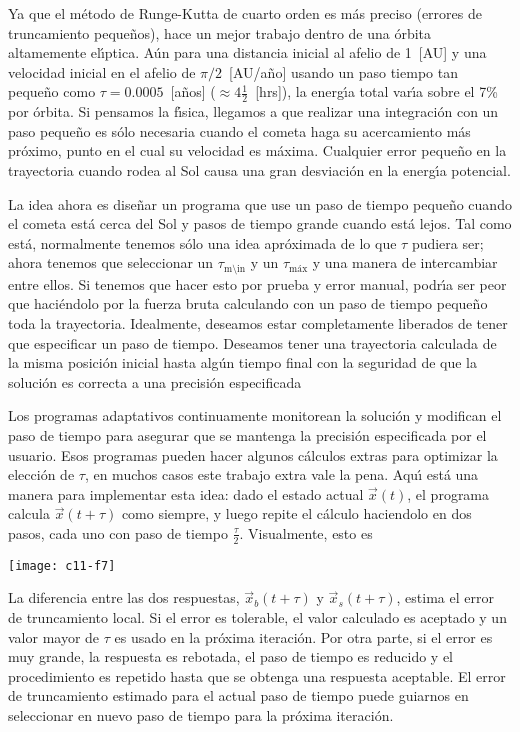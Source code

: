 Ya que el m{\'e}todo de Runge-Kutta de cuarto orden es m{\'a}s preciso
(errores de truncamiento peque{\~n}os), hace un mejor trabajo dentro de
una {\'o}rbita altamemente el{\'\i}ptica. A{\'u}n para una distancia inicial al
afelio de 1~[AU] y una velocidad inicial en el afelio de
$\pi/2$~[AU/a{\~n}o] usando un paso tiempo tan peque{\~n}o como
$\tau=0.0005$~[a{\~n}os] ($\approx4 \frac 12$~[hrs]), la energ{\'\i}a total var{\'\i}a sobre
el 7\% por {\'o}rbita. Si pensamos la f{\'\i}sica, llegamos a que realizar una
integraci{\'o}n con un paso peque{\~n}o es s{\'o}lo necesaria cuando el cometa
haga su acercamiento m{\'a}s pr{\'o}ximo, punto en el cual su velocidad es
m{\'a}xima. Cualquier error peque{\~n}o en la trayectoria cuando rodea al Sol
causa una gran desviaci{\'o}n en la energ{\'\i}a potencial.

La idea ahora es dise{\~n}ar un programa que use un paso de tiempo peque{\~n}o
cuando el cometa est{\'a} cerca del Sol y pasos de tiempo grande cuando
est{\'a} lejos. Tal como est{\'a}, normalmente tenemos s{\'o}lo una idea
apr{\'o}ximada de lo que $\tau$ pudiera ser; ahora tenemos que seleccionar un
$\tau_{\text{m{\'\i}n}}$ y un $\tau_{\text{m{\'a}x}}$ y una manera de intercambiar
entre ellos.  Si tenemos que hacer esto por prueba y error manual,
podr{\'\i}a ser peor que haci{\'e}ndolo por la fuerza bruta calculando con un
paso de tiempo peque{\~n}o toda la trayectoria.  Idealmente, deseamos
estar completamente liberados de tener que especificar un paso de
tiempo.  Deseamos tener una trayectoria calculada de la misma posici{\'o}n
inicial hasta alg{\'u}n tiempo final con la seguridad de que la soluci{\'o}n
es correcta a una precisi{\'o}n especificada
 
Los programas adaptativos continuamente monitorean la soluci{\'o}n y
modifican el paso de tiempo para asegurar que se mantenga la precisi{\'o}n
especificada por el usuario. Esos programas pueden hacer algunos
c{\'a}lculos extras para optimizar la elecci{\'o}n de $\tau$, en muchos casos
este trabajo extra vale la pena. Aqu{\'\i} est{\'a} una manera para implementar
esta idea: dado el estado actual $\vec x(t)$, el programa calcula
$\vec x(t+\tau)$ como siempre, y luego repite el c{\'a}lculo haciendolo en
dos pasos, cada uno con paso de tiempo $\frac{\tau}{2}$. Visualmente,
esto es

\begin{center}
\texttt{[image: c11-f7]}
\end{center}

La diferencia entre las dos respuestas, $\vec x_b(t+\tau)$ y $\vec
x_s(t+\tau)$, estima el error de truncamiento local. Si el error es
tolerable, el valor calculado es aceptado y un valor mayor de $\tau$ es
usado en la pr{\'o}xima iteraci{\'o}n. Por otra parte, si el error es muy
grande, la respuesta es rebotada, el paso de tiempo es reducido y el
procedimiento es repetido hasta que se obtenga una respuesta
aceptable. El error de truncamiento estimado para el actual paso de
tiempo puede guiarnos en seleccionar en nuevo paso de tiempo para la
pr{\'o}xima iteraci{\'o}n.


